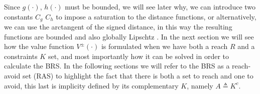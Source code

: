 Since $g(\cdot)$, $h(\cdot)$ must be bounded, we will see later why, we can introduce two constants $C_g$ $C_h$ to impose a saturation to the distance functions, or alternatively, we can use the arctangent of the signed distance, in this way the resulting functions are bounded and also globally Lipschtz \cite{reach_avoid_no_dist}. 
In the next section we will see how the value function $V^\pm(\cdot)$ is formulated when we have both a reach $R$ and a constraints $K$ set, and most importantly how it can be solved in order to calculate the BRS. In the following sections we will refer to the BRS as a reach-avoid set (RAS) to highlight the fact that there is both a set to reach and one to avoid, this last is implicity defined by its complementary $K$, namely $A \triangleq K^c$.

\begin{comment}	
The lower value of the game is given by the following value function $V(x,t)$ in which the control $u$ tries to minimize and the disturbance $d$ to maximize the cost $J(\cdot)$.
We assume that the player that wants to reach the target set $R$, namely the control input $u$ (Player 1), is restricted to use a non-anticipative strategies $\gamma[d](t)$ and we indicates the class of strategies admissible in a time interval $[\tau_i, \tau_f]$ as $\Gamma_{[\tau_i, \tau_f]}$.

\begin{equation}
\begin{split}
    V(x, t) 
    & = \inf_{\gamma(\cdot) \in \Gamma(\cdot) } \sup_{d(\cdot)} J(x, t, \gamma(\cdot), d(\cdot))    \\
    & = \inf_{\gamma(\cdot) \in \Gamma(\cdot) } \sup_{d(\cdot)} g(x(\tau_f))
\end{split}
\end{equation}


In practical scenarios, along the trajectory of a dynamical system there may be both goals to reach and obstacles to avoid. The goals to reach can be represented by the target set $R$ as previously done, the set of states to avoid instead, can be defined with another set $A$ (avoid) that contains all the system state $x$ that corresponds to an object collision, this new kind of set can be defined using a function $h(x)$ similar to $g(x)$. Formally: consider the sets $R$, $A$ related respectively to the level sets of two Lipschitz continuous and bounded functions $g: \mathbb{R}^n \rightarrow \mathbb{R}$, $h: \mathbb{R}^n \rightarrow \mathbb{R}$, then the two sets can be characterized as:


\end{comment}
